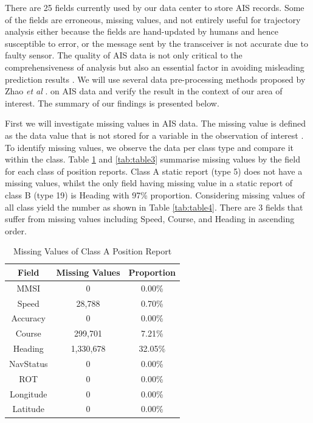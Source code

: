 There are 25 fields currently used by our data center to store AIS records. Some of the fields are erroneous, missing values, and not entirely useful for trajectory analysis either because the fields are hand-updated by humans and hence susceptible to error, or the message sent by the transceiver is not accurate due to faulty sensor. The quality of AIS data is not only critical to the comprehensiveness of analysis but also an essential factor in avoiding misleading prediction results \cite{zhao2018ship}.  We will use several data pre-processing methods proposed by Zhao \emph{et al} \cite{zhao2018ship}. on AIS data and verify the result in the context of our area of interest. The summary of our findings is presented below.

First we will investigate missing values in AIS data. The missing value is defined as the data value that is not stored for a variable in the observation of interest \cite{kang2013prevention}. To identify missing values, we observe the data per class type and compare it within the class. Table \ref{tab:table2} and \ref{tab:table3} summarise missing values by the field for each class of position reports. Class A static report (type 5) does not have a missing values, whilst the only field having missing value in a static report of class B (type 19) is Heading with 97\% proportion. Considering missing values of all class yield the number as shown in Table \ref{tab:table4}. There are 3 fields that suffer from missing values including Speed, Course, and Heading in ascending order.

\begin{table}[t!]
    \centering
    \caption{Missing Values of Class A Position Report}
    \label{tab:table2}
    \begin{tabular}{c|c|c}
      \hline
      \textbf{Field} & \textbf{Missing Values} & \textbf{Proportion}\\
      \hline
      MMSI & 0 & 0.00\%\\
      Speed & 28,788 & 0.70\%\\
      Accuracy & 0 & 0.00\%\\
      Course & 299,701 & 7.21\%\\
      Heading & 1,330,678 & 32.05\%\\
      NavStatus & 0 & 0.00\%\\
      ROT & 0 & 0.00\%\\
      Longitude & 0 & 0.00\%\\
      Latitude & 0 & 0.00\%\\
    \end{tabular}
\end{table}

